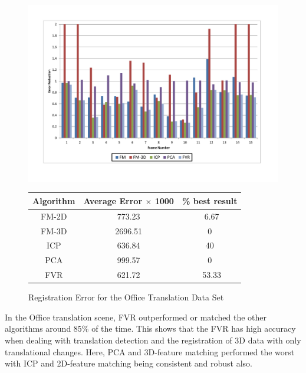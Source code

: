 \begin{figure}
\centering
\includegraphics[width=6in]{images/results/Office_Texture_Translation}
\caption{Registration Error for the Office Translation Data Set}
\label{fig:PET12}

\begin{tabular}{ccc}
\hline
\textbf{Algorithm} & \textbf{Average Error $\times$ 1000} & \textbf{\% best result}\\ \hline
FM-2D	& 773.23 & ~6.67\\
FM-3D	& 2696.51 & 0\\
ICP		& 636.84 & 40\\
PCA		& 999.57 & 0\\
FVR		& 621.72 & ~53.33\\
\end{tabular}
\label{tab:PET12ST}
\end{figure} 


In the Office translation scene, FVR outperformed or matched the other algorithms around 85\% of the time. This shows that the FVR has high accuracy when dealing with translation detection and the registration of 3D data with only translational changes. Here, PCA and 3D-feature matching performed the worst with ICP and 2D-feature matching being consistent and robust also. \\

